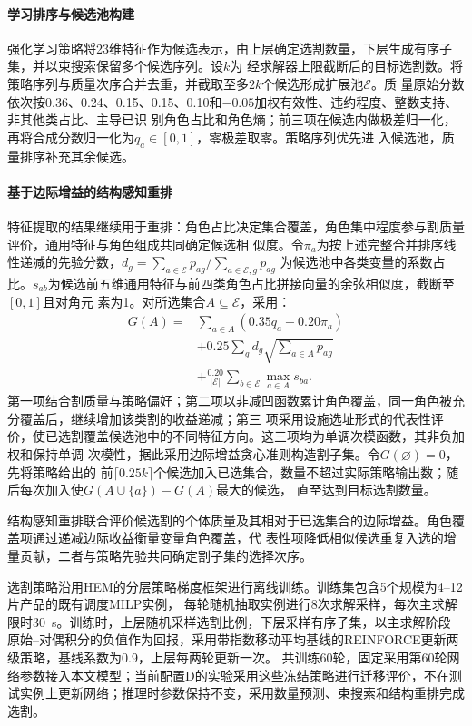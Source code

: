 \paragraph{学习排序与候选池构建}
强化学习策略将23维特征作为候选表示，由上层确定选割数量，下层生成有序子集，并以束搜索保留多个候选序列。设$k$为
经求解器上限截断后的目标选割数。将策略序列与质量次序合并去重，并截取至多$2k$个候选形成扩展池$\mathcal E$。质
量原始分数依次按0.36、0.24、0.15、0.15、0.10和$-0.05$加权有效性、违约程度、整数支持、非其他类占比、主导已识
别角色占比和角色熵；前三项在候选内做极差归一化，再将合成分数归一化为$q_a\in[0,1]$，零极差取零。策略序列优先进
入候选池，质量排序补充其余候选。

\paragraph{基于边际增益的结构感知重排}
特征提取的结果继续用于重排：角色占比决定集合覆盖，角色集中程度参与割质量评价，通用特征与角色组成共同确定候选相
似度。令$\pi_a$为按上述完整合并排序线性递减的先验分数，$d_g=\sum_{a\in\mathcal E}p_{ag}/\sum_{a\in\mathcal E,g}p_{ag}$
为候选池中各类变量的系数占比。$s_{ab}$为候选前五维通用特征与前四类角色占比拼接向量的余弦相似度，截断至$[0,1]$且对角元
素为1。对所选集合$A\subseteq\mathcal E$，采用：
\begin{equation}
\begin{aligned}
G(A)={}&\sum_{a\in A}(0.35q_a+0.20\pi_a)\\
&+0.25\sum_gd_g\sqrt{\sum_{a\in A}p_{ag}}\\
&+\frac{0.20}{|\mathcal E|}\sum_{b\in\mathcal E}\max_{a\in A}s_{ba}.
\end{aligned}
\label{eq:cut-rerank-cn}
\end{equation}
第一项结合割质量与策略偏好；第二项以非减凹函数累计角色覆盖，同一角色被充分覆盖后，继续增加该类割的收益递减；第三
项采用设施选址形式的代表性评价，使已选割覆盖候选池中的不同特征方向。这三项均为单调次模函数，其非负加权和保持单调
次模性\citep{krause2014submodular}，据此采用边际增益贪心准则构造割子集。令$G(\varnothing)=0$，先将策略给出的
前$\lceil0.25k\rceil$个候选加入已选集合，数量不超过实际策略输出数；随后每次加入使$G(A\cup\{a\})-G(A)$最大的候选，
直至达到目标选割数量。

结构感知重排联合评价候选割的个体质量及其相对于已选集合的边际增益。角色覆盖项通过递减边际收益衡量变量角色覆盖，代
表性项降低相似候选重复入选的增量贡献，二者与策略先验共同确定割子集的选择次序。

选割策略沿用HEM的分层策略梯度框架进行离线训练\citep{wang2023hem}。训练集包含5个规模为4--12片产品的既有调度MILP实例，
每轮随机抽取实例进行8次求解采样，每次主求解限时30~s。训练时，上层随机采样选割比例，下层采样有序子集，以主求解阶段
原始--对偶积分的负值作为回报，采用带指数移动平均基线的REINFORCE更新两级策略，基线系数为0.9，上层每两轮更新一次。
共训练60轮，固定采用第60轮网络参数接入本文模型；当前配置D的实验采用这些冻结策略进行迁移评价，不在测试实例上更新网络；推理时参数保持不变，采用数量预测、束搜索和结构重排完成选割。

